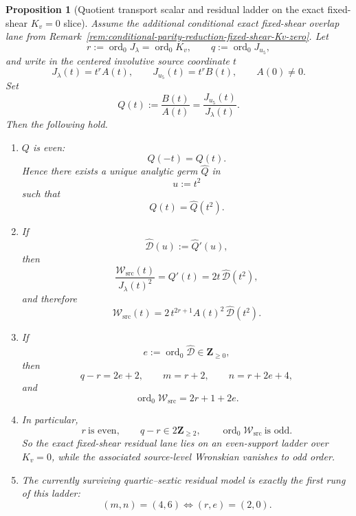 \documentclass[11pt,a4paper]{amsart}
\theoremstyle{plain}
\newtheorem{proposition}[theorem]{Proposition}
\theoremstyle{definition}
\begin{document}
\begin{proposition}[Quotient transport scalar and residual ladder on the exact fixed-shear $K_v=0$ slice]
\label{prop:quotient-transport-scalar-residual-ladder-fixed-shear-Kv-zero}
Assume the additional conditional exact fixed-shear overlap lane from
Remark~\ref{rem:conditional-parity-reduction-fixed-shear-Kv-zero}. Let
\[
r:=\operatorname{ord}_0J_\lambda=\operatorname{ord}_0K_v,
\qquad
q:=\operatorname{ord}_0J_{u_5},
\]
and write in the centered involutive source coordinate $t$
\[
J_\lambda(t)=t^rA(t),
\qquad
J_{u_5}(t)=t^rB(t),
\qquad
A(0)\neq 0.
\]
Set
\[
Q(t):=\frac{B(t)}{A(t)}=\frac{J_{u_5}(t)}{J_\lambda(t)}.
\]
Then the following hold.

\begin{enumerate}
\item $Q$ is even:
\[
Q(-t)=Q(t).
\]
Hence there exists a unique analytic germ $\widehat Q$ in
\[
u:=t^2
\]
such that
\[
Q(t)=\widehat Q(t^2).
\]

\item If
\[
\widehat{\mathcal D}(u):=\widehat Q'(u),
\]
then
\[
\frac{\mathcal W_{\mathrm{src}}(t)}{J_\lambda(t)^2}
=
Q'(t)
=
2t\,\widehat{\mathcal D}(t^2),
\]
and therefore
\[
\mathcal W_{\mathrm{src}}(t)
=
2\,t^{2r+1}A(t)^2\,\widehat{\mathcal D}(t^2).
\]

\item If
\[
e:=\operatorname{ord}_0\widehat{\mathcal D}\in\mathbf Z_{\ge 0},
\]
then
\[
q-r=2e+2,
\qquad
m=r+2,
\qquad
n=r+2e+4,
\]
and
\[
\operatorname{ord}_0\mathcal W_{\mathrm{src}}=2r+1+2e.
\]

\item In particular,
\[
r\ \text{is even},
\qquad
q-r\in 2\mathbf Z_{\ge 2},
\qquad
\operatorname{ord}_0\mathcal W_{\mathrm{src}}\ \text{is odd}.
\]
So the exact fixed-shear residual lane lies on an even-support ladder over
$K_v=0$, while the associated source-level Wronskian vanishes to odd order.

\item The currently surviving quartic--sextic residual model is exactly the
first rung of this ladder:
\[
(m,n)=(4,6)
\iff
(r,e)=(2,0).
\]
\end{enumerate}
\end{proposition}
\end{document}
